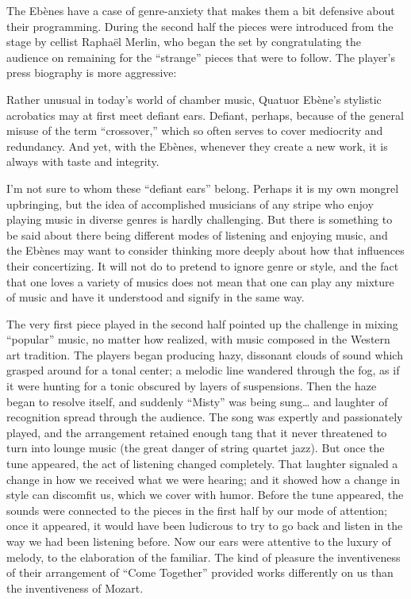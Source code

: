 The Ebènes have a case of genre-anxiety that makes them a bit defensive about their programming. During the second half the pieces were introduced from the stage by cellist Raphaël Merlin, who began the set by congratulating the audience on remaining for the “strange” pieces that were to follow. The player’s press biography is more aggressive:

Rather unusual in today’s world of chamber music, Quatuor Ebène’s stylistic acrobatics may at first meet defiant ears. Defiant, perhaps, because of the general misuse of the term “crossover,” which so often serves to cover mediocrity and redundancy. And yet, with the Ebènes, whenever they create a new work, it is always with taste and integrity.

I’m not sure to whom these “defiant ears” belong. Perhaps it is my own mongrel upbringing, but the idea of accomplished musicians of any stripe who enjoy playing music in diverse genres is hardly challenging. But there is something to be said about there being different modes of listening and enjoying music, and the Ebènes may want to consider thinking more deeply about how that influences their concertizing. It will not do to pretend to ignore genre or style, and the fact that one loves a variety of musics does not mean that one can play any mixture of music and have it understood and signify in the same way.

The very first piece played in the second half pointed up the challenge in mixing “popular” music, no matter how realized, with music composed in the Western art tradition. The players began producing hazy, dissonant clouds of sound which grasped around for a tonal center; a melodic line wandered through the fog, as if it were hunting for a tonic obscured by layers of suspensions. Then the haze began to resolve itself, and suddenly “Misty” was being sung… and laughter of recognition spread through the audience. The song was expertly and passionately played, and the arrangement retained enough tang that it never threatened to turn into lounge music (the great danger of string quartet jazz). But once the tune appeared, the act of listening changed completely. That laughter signaled a change in how we received what we were hearing; and it showed how a change in style can discomfit us, which we cover with humor. Before the tune appeared, the sounds were connected to the pieces in the first half by our mode of attention; once it appeared, it would have been ludicrous to try to go back and listen in the way we had been listening before. Now our ears were attentive to the luxury of melody, to the elaboration of the familiar. The kind of pleasure the inventiveness of their arrangement of “Come Together” provided works differently on us than the inventiveness of Mozart.

